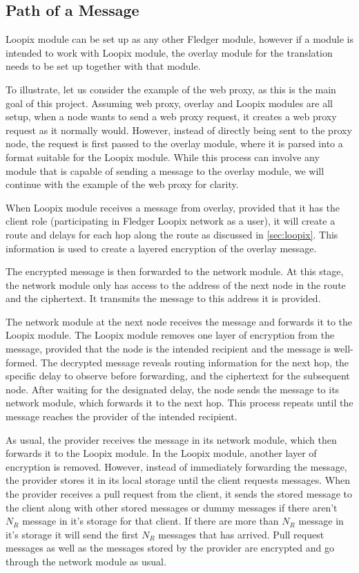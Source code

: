 \documentclass[a4paper,11pt,oneside]{report}
\begin{document}
\subsection{Path of a Message}
Loopix module can be set up as any other Fledger module, however if a module is intended to work with Loopix module, the overlay module for the translation needs to be set up together with that module. 
 
To illustrate, let us consider the example of the web proxy, as this is the main goal of this project. Assuming web proxy, overlay and Loopix modules are all setup, when a node wants to send a web proxy request, it creates a web proxy request as it normally would. However, instead of directly being sent to the proxy node, the request is first passed to the overlay module, where it is parsed into a format suitable for the Loopix module. While this process can involve any module that is capable of sending a message to the overlay module, we will continue with the example of the web proxy for clarity.
 
When Loopix module receives a message from overlay, provided that it has the client role (participating in Fledger Loopix network as a user), it will create a route and delays for each hop along the route as discussed in \autoref{sec:loopix}. This information is used to create a layered encryption of the overlay message.

The encrypted message is then forwarded to the network module. At this stage, the network module only has access to the address of the next node in the route and the ciphertext. It transmits the message to this address it is provided.

The network module at the next node receives the message and forwards it to the Loopix module. The Loopix module removes one layer of encryption from the message, provided that the node is the intended recipient and the message is well-formed. The decrypted message reveals routing information for the next hop, the specific delay to observe before forwarding, and the ciphertext for the subsequent node. After waiting for the designated delay, the node sends the message to its network module, which forwards it to the next hop. This process repeats until the message reaches the provider of the intended recipient.

As usual, the provider receives the message in its network module, which then forwards it to the Loopix module. In the Loopix module, another layer of encryption is removed. However, instead of immediately forwarding the message, the provider stores it in its local storage until the client requests messages. When the provider receives a pull request from the client, it sends the stored message to the client along with other stored messages or dummy messages if there aren't \(N_R\) message in it's storage for that client. If there are more than \(N_R\) message in it's storage it will send the first \(N_R\) messages that has arrived. Pull request messages as well as the messages stored by the provider are encrypted and go through the network module as usual.
\end{document}

